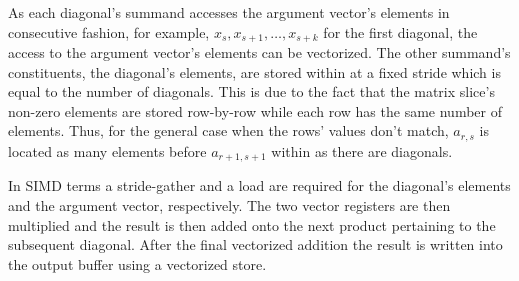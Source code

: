 \documentclass{article}
\begin{document}
      As each diagonal's summand accesses the argument vector's elements in consecutive fashion, for example, $x_s, x_{s+1}, \ldots, x_{s + k}$ for the first diagonal, the access to the argument vector's elements can be vectorized. The other summand's constituents, the diagonal's elements, are stored within \V at a fixed stride which is equal to the number of diagonals. This is due to the fact that the matrix slice's non-zero elements are stored row-by-row while each row has the same number of elements. Thus, for the general case when the rows' values don't match, $a_{r, s}$ is located as many elements before $a_{r+1, s+1}$ within \V as there are diagonals.

      In SIMD terms a stride-gather and a load are required for the diagonal's elements and the argument vector, respectively. The two vector registers are then multiplied and the result is then added onto the next product pertaining to the subsequent diagonal. After the final vectorized addition the result is written into the output buffer using a vectorized store.
\end{document}

